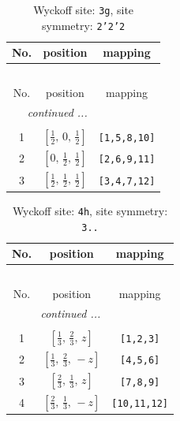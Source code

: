 \documentclass[fleqn,8pt]{jsarticle}
\begin{document}
\begin{longtable}{ccc}
\caption{Wyckoff site: {\tt 3g}, site symmetry: {\tt 2'2'2}}
 \\
 \hline \hline
No. & position & mapping \\ \hline \endfirsthead

\multicolumn{2}{l}{\tablename\ \thetable{}} \\
 \hline \hline
No. & position & mapping \\ \hline \endhead

 \hline \hline
\multicolumn{2}{r}{\footnotesize\it continued ...} \\ \endfoot

 \hline \hline
\multicolumn{2}{r}{} \\ \endlastfoot

1 & $\left[ \frac{1}{2},\, 0,\, \frac{1}{2} \right]$ & {\tt [1,5,8,10]} \\ \hline
2 & $\left[ 0,\, \frac{1}{2},\, \frac{1}{2} \right]$ & {\tt [2,6,9,11]} \\ \hline
3 & $\left[ \frac{1}{2},\, \frac{1}{2},\, \frac{1}{2} \right]$ & {\tt [3,4,7,12]} \\
\end{longtable}
\renewcommand{\arraystretch}{1.2}
\begin{longtable}{ccc}
\caption{Wyckoff site: {\tt 4h}, site symmetry: {\tt 3..}}
 \\
 \hline \hline
No. & position & mapping \\ \hline \endfirsthead

\multicolumn{2}{l}{\tablename\ \thetable{}} \\
 \hline \hline
No. & position & mapping \\ \hline \endhead

 \hline \hline
\multicolumn{2}{r}{\footnotesize\it continued ...} \\ \endfoot

 \hline \hline
\multicolumn{2}{r}{} \\ \endlastfoot

1 & $\left[ \frac{1}{3},\, \frac{2}{3},\, z \right]$ & {\tt [1,2,3]} \\ \hline
2 & $\left[ \frac{1}{3},\, \frac{2}{3},\, - z \right]$ & {\tt [4,5,6]} \\ \hline
3 & $\left[ \frac{2}{3},\, \frac{1}{3},\, z \right]$ & {\tt [7,8,9]} \\ \hline
4 & $\left[ \frac{2}{3},\, \frac{1}{3},\, - z \right]$ & {\tt [10,11,12]} \\
\end{longtable}
\end{document}

